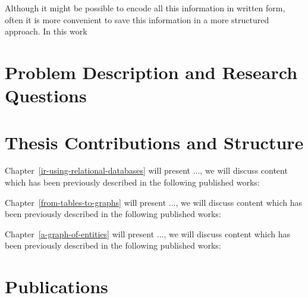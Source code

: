 Although it might be possible to encode all this information in written form, often it is more convenient to save this information in a more structured approach. In this work 

\section{Problem Description and Research Questions}



\section{Thesis Contributions and Structure}

Chapter~\ref{ir-using-relational-databases} will present ..., we will discuss content which has been previously described in the following published works: \cite{Kamphuis2020BM25, olddog-docker}

Chapter~\ref{from-tables-to-graphs} will present ..., we will discuss content which has been previously described in the following published works: \cite{need-graph-db, geesedb}

Chapter~\ref{a-graph-of-entities} will present ..., we will discuss content which has been previously described in the following published works: \cite{rebl}

\section{Publications}